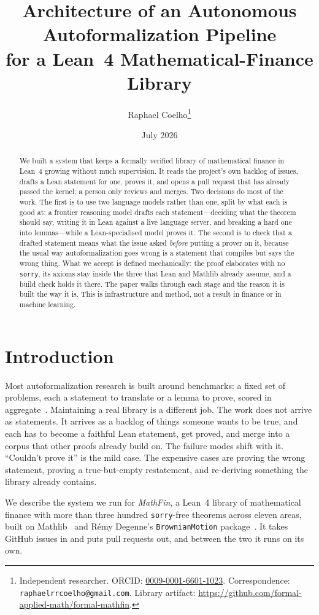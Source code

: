 \documentclass[11pt]{article}
\title{Architecture of an Autonomous Autoformalization Pipeline\\
  for a Lean~4 Mathematical-Finance Library}
\author{Raphael Coelho\thanks{Independent researcher.
  ORCID: \href{https://orcid.org/0009-0001-6601-1023}{0009-0001-6601-1023}.
  Correspondence: \texttt{raphaelrrcoelho@gmail.com}.
  Library artifact: \url{https://github.com/formal-applied-math/formal-mathfin}.}}
\date{July 2026}
\newcommand{\lean}[1]{\texttt{\def\_{\textunderscore\allowbreak}#1}}
\begin{document}
\maketitle

\begin{abstract}
We built a system that keeps a formally verified library of mathematical finance in
Lean~4 growing without much supervision. It reads the project's own backlog of issues,
drafts a Lean statement for one, proves it, and opens a pull request that has already
passed the kernel; a person only reviews and merges. Two decisions do most of the work.
The first is to use two language models rather than one, split by what each is good at:
a frontier reasoning model drafts each statement---deciding what the theorem should say,
writing it in Lean against a live language server, and breaking a hard one into
lemmas---while a Lean-specialised model proves it. The second is to
check that a drafted statement means what the issue asked \emph{before} putting a prover
on it, because the usual way autoformalization goes wrong is a statement that compiles
but says the wrong thing. What we accept is defined mechanically: the proof elaborates
with no \lean{sorry}, its axioms stay inside the three that Lean and Mathlib already
assume, and a build check holds it there. The paper walks through each stage and the
reason it is built the way it is. This is infrastructure and method, not a result in
finance or in machine learning.
\end{abstract}

\section{Introduction}

Most autoformalization research is built around benchmarks: a fixed set of problems,
each a statement to translate or a lemma to prove, scored in
aggregate~\cite{wu2022autoform,jiang2023draft}. Maintaining a real library is a
different job. The work does not arrive as statements. It arrives as a backlog of things
someone wants to be true, and each has to become a faithful Lean statement, get proved,
and merge into a corpus that other proofs already build on. The failure modes shift with
it. ``Couldn't prove it'' is the mild case. The expensive cases are proving the wrong
statement, proving a true-but-empty restatement, and re-deriving something the library
already contains.

We describe the system we run for \emph{MathFin}, a Lean~4 library of mathematical
finance with more than three hundred \lean{sorry}-free theorems across eleven areas,
built on Mathlib~\cite{mathlib2020} and R\'emy Degenne's \lean{BrownianMotion}
package~\cite{brownianMotion}. It takes GitHub issues in and puts pull requests out, and
between the two it runs on its own.
\end{document}

